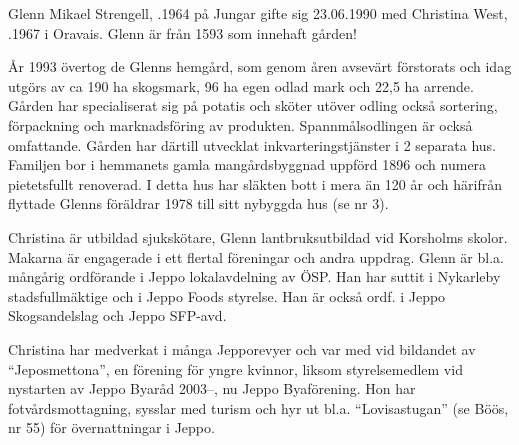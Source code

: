 %



%
Glenn Mikael Strengell, .1964 på Jungar gifte sig 23.06.1990 med Christina West, .1967 i  Oravais. Glenn är  från 1593 som innehaft gården!

År 1993 övertog de Glenns hemgård, som genom åren avsevärt förstorats och idag utgörs av ca 190 ha skogsmark, 96 ha egen odlad mark och 22,5 ha arrende. Gården har specialiserat sig på potatis och sköter utöver odling också sortering, förpackning och marknadsföring av produkten. Spannmålsodlingen är också omfattande. Gården har därtill utvecklat inkvarteringstjänster i 2 separata hus. Familjen bor i hemmanets gamla mangårdsbyggnad uppförd 1896 och numera pietetsfullt renoverad. I detta hus har släkten bott i mera än 120 år och härifrån flyttade Glenns föräldrar 1978 till sitt nybyggda hus (se nr 3).

Christina är utbildad sjukskötare, Glenn lantbruksutbildad vid Korsholms skolor. Makarna är engagerade i ett flertal föreningar och andra uppdrag. Glenn är bl.a. mångårig ordförande i Jeppo lokalavdelning av ÖSP. Han har suttit i Nykarleby stadsfullmäktige och i Jeppo Foods styrelse. Han är också ordf. i Jeppo Skogsandelslag och Jeppo SFP-avd.

Christina har medverkat i många Jepporevyer och var med vid bildandet av ``Jeposmettona'', en förening för yngre kvinnor, liksom styrelsemedlem vid nystarten av Jeppo Byaråd 2003--, nu Jeppo Byaförening. Hon har fotvårdsmottagning, sysslar med turism och hyr ut bl.a. ``Lovisastugan'' (se Böös, nr 55) för övernattningar i Jeppo.
\begin{jhchildren}
  \item {}
  \item {}
  \item {}
  \item {}
\end{jhchildren}


